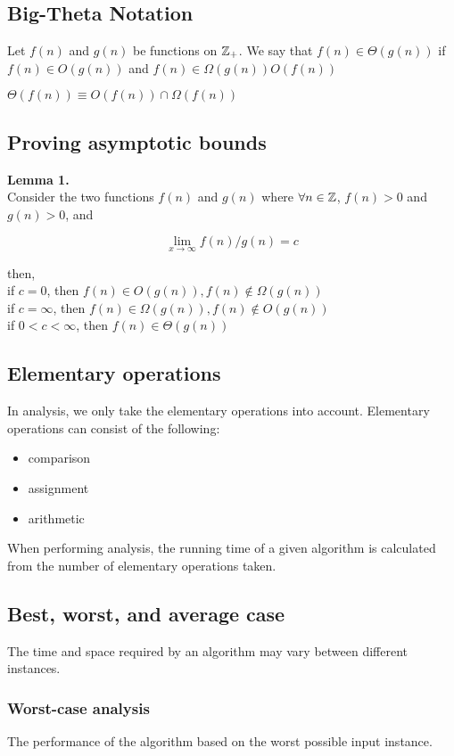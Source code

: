 \documentclass[a4paper]{article}
\begin{document}
\subsection{Big-Theta Notation}
Let $f(n)$ and $g(n)$ be functions on $\mathbb{Z}_{+}$. We say that $f(n) \in \Theta(g(n))$ if $f(n) \in O(g(n))$ and $f(n) \in \Omega(g(n)) O(f(n))$

\begin{center} $\Theta(f(n)) \equiv O(f(n))\cap \Omega(f(n))$ \end{center}

\subsection{Proving asymptotic bounds}
\textbf{Lemma 1.}\\
Consider the two functions $f(n)$ and $g(n)$ where $\forall n \in \mathbb{Z}$, $f(n) > 0$ and $g(n) > 0$, and
\begin{center} $$\lim_{x\to\infty}f(n)/g(n) = c$$ \end{center}
then,\\
if $c=0$, then $f(n)\in O(g(n)), f(n) \notin \Omega(g(n))$\\
if $c=\infty$, then $f(n)\in \Omega(g(n)), f(n) \notin O(g(n))$\\
if $0<c<\infty$, then $f(n)\in \Theta(g(n))$

\subsection{Elementary operations}
In analysis, we only take the elementary operations into account. Elementary operations can consist of the following:
\begin{itemize}
	\itemsep0em
	\item comparison
	\item assignment
	\item arithmetic
\end{itemize}
When performing analysis, the running time of a given algorithm is calculated from the number of elementary operations taken.

\subsection{Best, worst, and average case}
The time and space required by an algorithm may vary between different instances.
\subsubsection{Worst-case analysis}
The performance of the algorithm based on the worst possible input instance.
\end{document}
